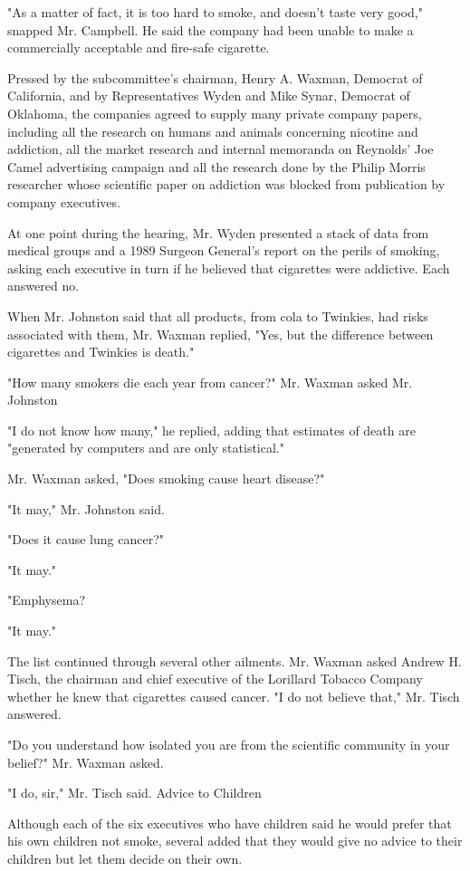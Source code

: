 "As a matter of fact, it is too hard to smoke, and doesn't taste very
good," snapped Mr. Campbell. He said the company had been unable to make
a commercially acceptable and fire-safe cigarette.

Pressed by the subcommittee's chairman, Henry A. Waxman, Democrat of
California, and by Representatives Wyden and Mike Synar, Democrat of
Oklahoma, the companies agreed to supply many private company papers,
including all the research on humans and animals concerning nicotine and
addiction, all the market research and internal memoranda on Reynolds'
Joe Camel advertising campaign and all the research done by the Philip
Morris researcher whose scientific paper on addiction was blocked from
publication by company executives.

At one point during the hearing, Mr. Wyden presented a stack of data
from medical groups and a 1989 Surgeon General's report on the perils of
smoking, asking each executive in turn if he believed that cigarettes
were addictive. Each answered no.

When Mr. Johnston said that all products, from cola to Twinkies, had
risks associated with them, Mr. Waxman replied, "Yes, but the difference
between cigarettes and Twinkies is death."

"How many smokers die each year from cancer?" Mr. Waxman asked Mr.
Johnston

"I do not know how many," he replied, adding that estimates of death are
"generated by computers and are only statistical."

Mr. Waxman asked, "Does smoking cause heart disease?"

"It may," Mr. Johnston said.

"Does it cause lung cancer?"

"It may."

"Emphysema?

"It may."

The list continued through several other ailments. Mr. Waxman asked
Andrew H. Tisch, the chairman and chief executive of the Lorillard
Tobacco Company whether he knew that cigarettes caused cancer. "I do not
believe that," Mr. Tisch answered.

"Do you understand how isolated you are from the scientific community in
your belief?" Mr. Waxman asked.

"I do, sir," Mr. Tisch said. Advice to Children

Although each of the six executives who have children said he would
prefer that his own children not smoke, several added that they would
give no advice to their children but let them decide on their own.

